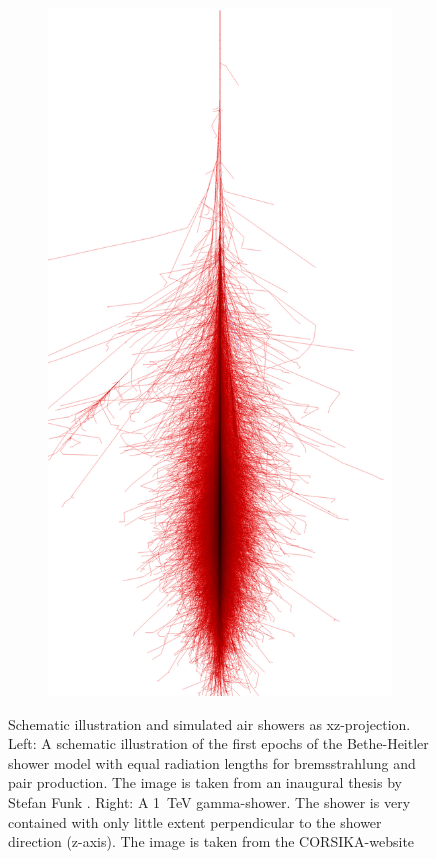 \begin{figure}
\begin{subfigure}{.3\textwidth}
		\includegraphics[width=.9\linewidth]{images/corsika_1tev_photon.png}
	\end{subfigure}
	\caption{Schematic illustration and simulated air showers as xz-projection.
		Left: A schematic illustration of the first epochs of the 
		Bethe-Heitler shower model with equal radiation lengths for
		bremsstrahlung and pair production.
		The image is taken from an inaugural thesis 
		by Stefan Funk \cite{funk_doctor}.
		Right: A \SI{1}{\tera\electronvolt} gamma-shower.
		The shower is very contained with only little extent perpendicular 
		to the shower direction (z-axis). The image is taken from 
		the CORSIKA-website \cite{corsika_showers}}
	\label{fig:gamma_shower}
\end{figure}

